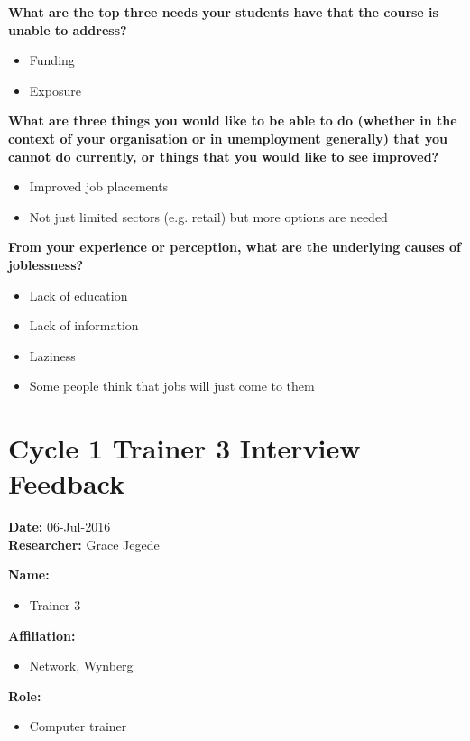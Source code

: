 \noindent\textbf{What are the top three needs your students have that the course is unable to address?}
\begin{itemize}
\item Funding
\item Exposure
\end{itemize}

\noindent\textbf{What are three things you would like to be able to do (whether in the context of your organisation or in unemployment generally) that you cannot do currently, or things that you would like to see improved?}
\begin{itemize}
\item Improved job placements
\item Not just limited sectors (e.g. retail) but more options are needed
\end{itemize}

\noindent\textbf{From your experience or perception, what are the underlying causes of joblessness?}
\begin{itemize}
\item Lack of education
\item Lack of information
\item Laziness
\item Some people think that jobs will just come to them
\end{itemize}

\section{Cycle 1 Trainer 3 Interview Feedback}

\noindent\textbf{Date:} 06-Jul-2016 \\
\noindent\textbf{Researcher:} Grace Jegede



\noindent\textbf{Name:}
\begin{itemize}
\item Trainer 3
\end{itemize}

\noindent\textbf{Affiliation:}
\begin{itemize}
\item Network, Wynberg
\end{itemize}

\noindent\textbf{Role:}
\begin{itemize}
\item Computer trainer
\end{itemize}


